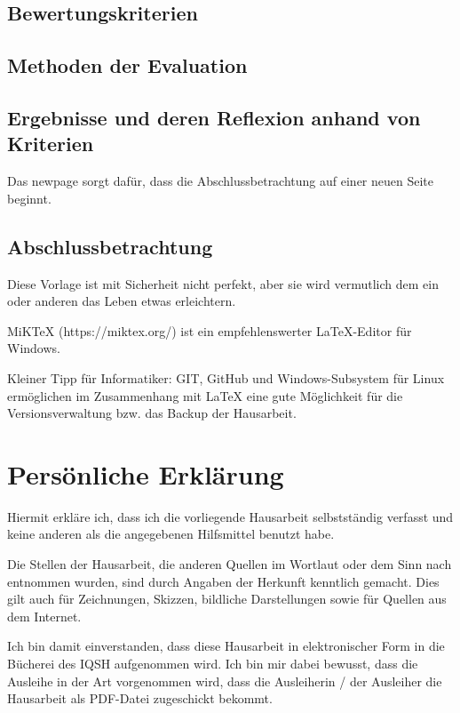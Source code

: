 \documentclass[a4paper, 12pt]{article}
\begin{document}
\subsection{Bewertungskriterien}
\subsection{Methoden der Evaluation}
\subsection{Ergebnisse und deren Reflexion anhand von Kriterien}
Das newpage sorgt dafür, dass die Abschlussbetrachtung auf einer neuen Seite beginnt.
\newpage
\subsection{Abschlussbetrachtung}
Diese Vorlage ist mit Sicherheit nicht perfekt, aber sie wird vermutlich dem ein oder anderen das Leben etwas erleichtern.

MiKTeX (https://miktex.org/) ist ein empfehlenswerter \LaTeX{}-Editor für Windows.

Kleiner Tipp für Informatiker: \glqq GIT\grqq{}, \glqq GitHub\grqq{} und \glqq Windows-Subsystem für Linux\grqq{} ermöglichen im Zusammenhang mit \LaTeX{} eine gute Möglichkeit für die Versionsverwaltung bzw. das Backup der Hausarbeit.


\newpage
\thispagestyle{empty}



\newpage
\thispagestyle{empty}
\section*{Persönliche Erklärung}

Hiermit erkläre ich, dass ich die vorliegende Hausarbeit selbstständig verfasst und keine anderen als die angegebenen Hilfsmittel benutzt habe.

Die Stellen der Hausarbeit, die anderen Quellen im Wortlaut oder dem Sinn nach entnommen wurden, sind durch Angaben der Herkunft kenntlich gemacht. Dies gilt auch für Zeichnungen, Skizzen, bildliche Darstellungen sowie für Quellen aus dem Internet.

Ich bin damit einverstanden, dass diese Hausarbeit in elektronischer Form in die Bücherei des IQSH aufgenommen wird. Ich bin mir dabei bewusst, dass die Ausleihe in der Art vorgenommen wird, dass die Ausleiherin / der Ausleiher die Hausarbeit als PDF-Datei zugeschickt bekommt.
\end{document}
